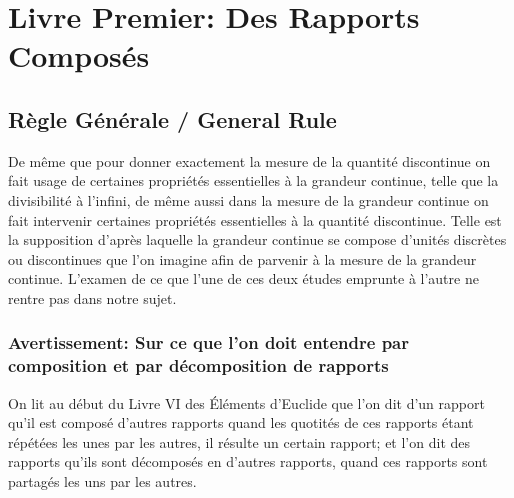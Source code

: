 \documentclass[11pt,a4paper]{article}
\theoremstyle{plain}
\theoremstyle{definition}
\theoremstyle{remark}
\begin{document}
\clearpage






\section{Livre Premier: Des Rapports Composés}

\label{sec:livre1}



\subsection*{Règle Générale / General Rule}






De même que pour donner exactement la mesure de la quantité discontinue on fait usage de certaines propriétés essentielles à la grandeur continue, telle que la divisibilité à l'infini, de même aussi dans la mesure de la grandeur continue on fait intervenir certaines propriétés essentielles à la quantité discontinue. Telle est la supposition d'après laquelle la grandeur continue se compose d'unités discrètes ou discontinues que l'on imagine afin de parvenir à la mesure de la grandeur continue. L'examen de ce que l'une de ces deux études emprunte à l'autre ne rentre pas dans notre sujet.





\subsubsection*{Avertissement: Sur ce que l'on doit entendre par composition et par décomposition de rapports}





On lit au début du Livre VI des Éléments d'Euclide que l'on dit d'un rapport qu'il est composé d'autres rapports quand les quotités de ces rapports étant répétées les unes par les autres, il résulte un certain rapport; et l'on dit des rapports qu'ils sont décomposés en d'autres rapports, quand ces rapports sont partagés les uns par les autres.
\end{document}
